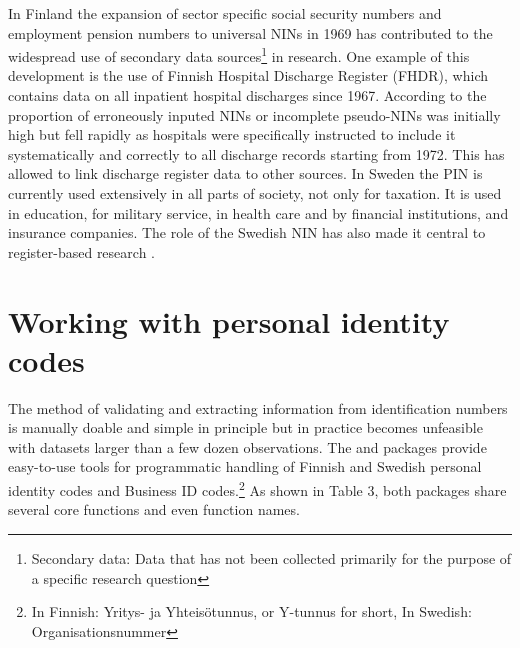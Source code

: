 In Finland the expansion of sector specific social security numbers and employment pension numbers to universal NINs in 1969 has contributed to the widespread use of secondary data sources\footnote{Secondary data: Data that has not been collected primarily for the purpose of a specific research question} in research. One example of this development is the use of Finnish Hospital Discharge Register (FHDR), which contains data on all inpatient hospital discharges since 1967. According to \citet{sund2012} the proportion of erroneously inputed NINs or incomplete pseudo-NINs was initially high but fell rapidly as hospitals were specifically instructed to include it systematically and correctly to all discharge records starting from 1972. This has allowed to link discharge register data to other sources. In Sweden the PIN is currently used extensively in all parts of society, not only for taxation. It is used in education, for military service, in health care and by financial institutions, and insurance companies. The role of the Swedish NIN has also made it central to register-based research \citep{scb2016}.

\section{Working with personal identity codes}

The method of validating and extracting information from identification numbers is manually doable and simple in principle but in practice becomes unfeasible with datasets larger than a few dozen observations. The  and  packages provide easy-to-use tools for programmatic handling of Finnish and Swedish personal identity codes and Business ID codes.\footnote{In Finnish: Yritys- ja Yhteisötunnus, or Y-tunnus for short, In Swedish: Organisationsnummer} As shown in Table 3, both packages share several core functions and even function names.

